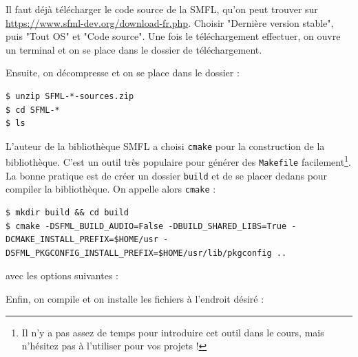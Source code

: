 \documentclass{book}
\begin{document}
Il faut déjà télécharger le code source de la SMFL, qu'on peut trouver sur \url{https://www.sfml-dev.org/download-fr.php}. Choisir "Dernière version stable", puis "Tout OS" et "Code source". Une fois le téléchargement effectuer, on ouvre un terminal et on se place dans le dossier de téléchargement.

Ensuite, on décompresse et on se place dans le dossier :
\begin{verbatim}
$ unzip SFML-*-sources.zip
$ cd SFML-*
$ ls
\end{verbatim}

L'auteur de la bibliothèque SMFL a choisi \texttt{cmake} pour la construction de la bibliothèque. C'est un outil très populaire pour générer des \texttt{Makefile} facilement\footnote{Il n'y a pas assez de temps pour introduire cet outil dans le cours, mais n'hésitez pas à l'utiliser pour vos projets !}. La bonne pratique est de créer un dossier \texttt{build} et de se placer dedans pour compiler la bibliothèque. On appelle alors \texttt{cmake} :

\begin{verbatim}
$ mkdir build && cd build
$ cmake -DSFML_BUILD_AUDIO=False -DBUILD_SHARED_LIBS=True -DCMAKE_INSTALL_PREFIX=$HOME/usr -DSFML_PKGCONFIG_INSTALL_PREFIX=$HOME/usr/lib/pkgconfig ..
\end{verbatim}
avec les options suivantes :

\vspace{1em}
Enfin, on compile et on installe les fichiers à l'endroit désiré :
\end{document}
